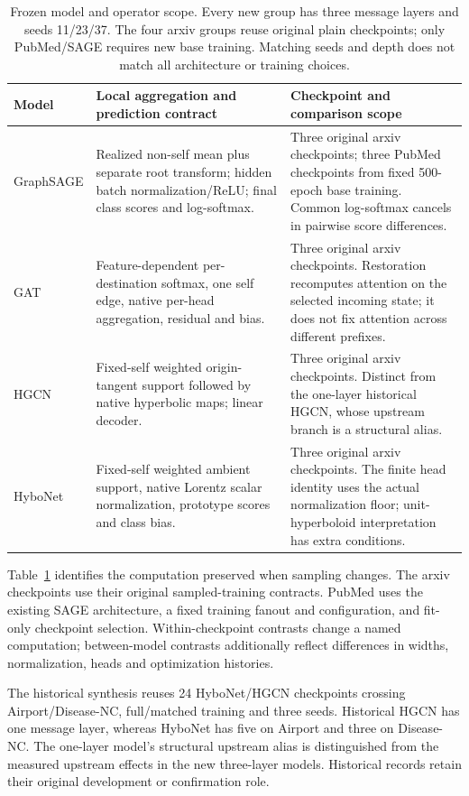 \documentclass[sigconf, nonacm]{acmart}
\begin{document}
\begin{table}[tp]
\centering\small
\caption{Frozen model and operator scope. Every new group has three message layers and seeds 11/23/37. The four arxiv groups reuse original plain checkpoints; only PubMed/SAGE requires new base training. Matching seeds and depth does not match all architecture or training choices.}
\label{tab:model-contracts}
\begin{tabular}{p{}p{}p{}}
\toprule
Model & Local aggregation and prediction contract & Checkpoint and comparison scope\\
\midrule
GraphSAGE & Realized non-self mean plus separate root transform; hidden batch normalization/ReLU; final class scores and log-softmax. & Three original arxiv checkpoints; three PubMed checkpoints from fixed 500-epoch base training. Common log-softmax cancels in pairwise score differences.\\
GAT & Feature-dependent per-destination softmax, one self edge, native per-head aggregation, residual and bias. & Three original arxiv checkpoints. Restoration recomputes attention on the selected incoming state; it does not fix attention across different prefixes.\\
HGCN & Fixed-self weighted origin-tangent support followed by native hyperbolic maps; linear decoder. & Three original arxiv checkpoints. Distinct from the one-layer historical HGCN, whose upstream branch is a structural alias.\\
HyboNet & Fixed-self weighted ambient support, native Lorentz scalar normalization, prototype scores and class bias. & Three original arxiv checkpoints. The finite head identity uses the actual normalization floor; unit-hyperboloid interpretation has extra conditions.\\
\bottomrule
\end{tabular}
\end{table}

Table~\ref{tab:model-contracts} identifies the computation preserved when sampling changes. The arxiv checkpoints use their original sampled-training contracts. PubMed uses the existing SAGE architecture, a fixed training fanout and configuration, and fit-only checkpoint selection. Within-checkpoint contrasts change a named computation; between-model contrasts additionally reflect differences in widths, normalization, heads and optimization histories.

The historical synthesis reuses 24 HyboNet/HGCN checkpoints crossing Airport/Disease-NC, full/matched training and three seeds. Historical HGCN has one message layer, whereas HyboNet has five on Airport and three on Disease-NC. The one-layer model's structural upstream alias is distinguished from the measured upstream effects in the new three-layer models. Historical records retain their original development or confirmation role.
\end{document}
